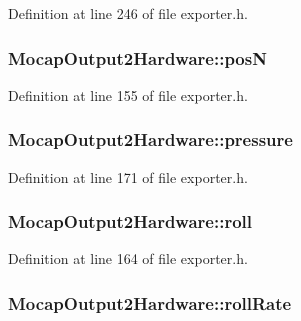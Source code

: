 Definition at line 246 of file exporter.\-h.

\hypertarget{group___mo_cap_plugin_ga75792a6a49b67e8d7b63a219ca0f2ed2}{
\subsubsection[{pos\-N}]{ Mocap\-Output2\-Hardware\-::pos\-N}}\label{group___mo_cap_plugin_ga75792a6a49b67e8d7b63a219ca0f2ed2}


Definition at line 155 of file exporter.\-h.

\hypertarget{group___mo_cap_plugin_ga521e946322d097a3b14b24f53ce1568f}{
\subsubsection[{pressure}]{ Mocap\-Output2\-Hardware\-::pressure}}\label{group___mo_cap_plugin_ga521e946322d097a3b14b24f53ce1568f}


Definition at line 171 of file exporter.\-h.

\hypertarget{group___mo_cap_plugin_ga6db93cd0e529bbfcb33af3293ab16c62}{
\subsubsection[{roll}]{ Mocap\-Output2\-Hardware\-::roll}}\label{group___mo_cap_plugin_ga6db93cd0e529bbfcb33af3293ab16c62}


Definition at line 164 of file exporter.\-h.

\hypertarget{group___mo_cap_plugin_ga178bcd8c81449eb7c9cc5c5bb203e591}{
\subsubsection[{roll\-Rate}]{ Mocap\-Output2\-Hardware\-::roll\-Rate}}\label{group___mo_cap_plugin_ga178bcd8c81449eb7c9cc5c5bb203e591}


